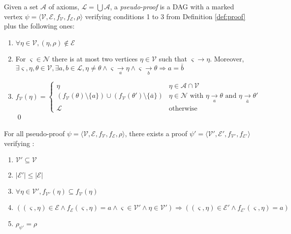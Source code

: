 \documentclass{llncs}
\newcommand{\dual}[1]{\ensuremath{\bar{#1}}}
\begin{document}
\begin{definition}
Given a set $\mathcal{A}$ of axioms, $\mathcal{L} = \bigcup{\mathcal{A}}$, a \emph{pseudo-proof} is
a DAG with a marked vertex $\psi = \langle \mathcal{V}, \mathcal{E}, f_\mathcal{V}, f_\mathcal{E},
\rho \rangle$ verifying conditions 1 to 3 from Definition \ref{def:proof} plus the following ones:
\begin{enumerate}%
  \item $\forall \eta \in \mathcal{V}, (\eta, \rho) \notin \mathcal{E}$
  \item For $\varsigma \in \mathcal{N}$ there is at most two vertices $\eta \in \mathcal{V}$ such
    that $\varsigma \rightarrow \eta$. Moreover, $\exists \varsigma, \eta, \theta \in \mathcal{V},
    \exists a, b \in \mathcal{L}, \eta \neq \theta \wedge \varsigma \xrightarrow[a]{} \eta \wedge
    \varsigma \xrightarrow[b]{} \theta \Rightarrow a = \dual{b}$
  \item %
    \begin{equation*}
      f_\mathcal{V}(\eta) = \begin{cases}
        \eta & \eta \in \mathcal{A} \cap \mathcal{V} \\
        \left(f_\mathcal{V}(\theta) \setminus \{a\}\right) \cup
        \left(f_\mathcal{V}(\theta') \setminus \{\dual{a}\}\right) &
              \eta \in \mathcal{N} \text{ with } \eta \xrightarrow[a]{} \theta \text{ and }
                                               \eta \xrightarrow[\dual{a}]{} \theta' \\
        \mathcal{L} & \text{otherwise}
      \end{cases}
    \end{equation*}
  \qed
\end{enumerate}
\end{definition}

\begin{proposition}
For all pseudo-proof $\psi = \langle \mathcal{V}, \mathcal{E}, f_\mathcal{V}, f_\mathcal{E}, \rho \rangle$,
there exists a proof $\psi' = \langle \mathcal{V}', \mathcal{E}', f_{\mathcal{V}'},
f_{\mathcal{E}'} \rangle$ verifying :
\begin{enumerate}%
  \item $\mathcal{V}' \subseteq \mathcal{V}$
  \item $|\mathcal{E}'| \leq |\mathcal{E}|$
  \item $\forall \eta \in \mathcal{V}', f_{\mathcal{V}'}(\eta) \subseteq f_\mathcal{V}(\eta)$
  \item $( (\varsigma,\eta) \in \mathcal{E} \wedge f_\mathcal{E}(\varsigma, \eta) = a \wedge
    \varsigma \in \mathcal{V}' \wedge \eta \in \mathcal{V}' ) \Rightarrow (
    (\varsigma,\eta) \in \mathcal{E}' \wedge f_{\mathcal{E}'}(\varsigma, \eta) = a )$
  \item $\rho_{\psi'} = \rho$
\end{enumerate}
\end{proposition}
\end{document}
